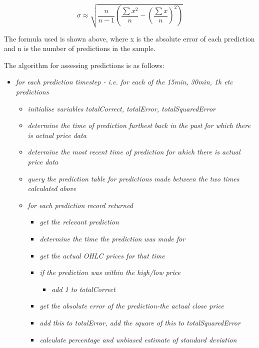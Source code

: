             \begin{equation}
            \sigma \approx \sqrt{\frac{n}{n-1}(\frac{\sum x^{2}}{n} - (\frac{\sum x}{n})^{2})}
            \end{equation}

            The formula used is shown above, where x is the absolute error of each prediction and n is the number of predictions in the sample.

            The algorithm for assessing predictions is as follows: 
            \begin{itemize}
                \item \textit{for each prediction timestep - i.e. for each of the 15min, 30min, 1h etc predictions}
                    \begin{itemize}
                        \item \textit{initialise variables totalCorrect, totalError, totalSquaredError}
                        \item \textit{determine the time of prediction furthest back in the past for which there is actual price data}
                        \item \textit{determine the most recent time of prediction for which there is actual price data}
                        \item \textit{query the prediction table for predictions made between the two times calculated above}
                        \item \textit{for each prediction record returned}
                        \begin{itemize}
                            \item \textit{get the relevant prediction}
                            \item \textit{determine the time the prediction was made for}
                            \item \textit{get the actual OHLC prices for that time}
                            \item \textit{if the prediction was within the high/low price}
                            \begin{itemize}
                                \item \textit{add 1 to totalCorrect}
                            \end{itemize} 
                            \item \textit{get the absolute error of the prediction-the actual close price}
                            \item \textit{add this to totalError, add the square of this to totalSquaredError}
                            \item \textit{calculate percentage and unbiased estimate of standard deviation}
                        \end{itemize}
                    \end{itemize}
            \end{itemize}

